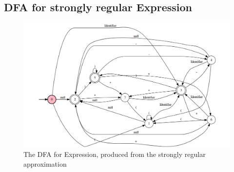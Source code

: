 \pagebreak\subsection{DFA for strongly regular Expression}
\begin{figure}[h]
	\centering
	\includegraphics[scale=0.42]{Figures/advancedGrammar_DFA.png}
	\decoRule
 	\caption[DFA for Expresion]{The DFA for Expression, produced from the strongly regular approximation}
 	\label{fig:advancedGrammar:DFA:Expression}
\end{figure}

